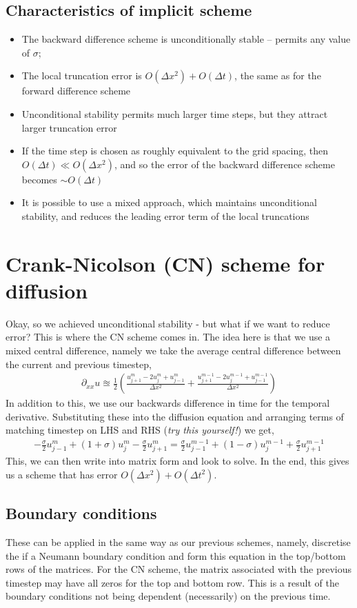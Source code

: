 \documentclass[11pt,a4paper]{report}
\theoremstyle{definition}
\begin{document}
\subsection{Characteristics of implicit scheme}
\begin{itemize}
	\item The backward difference scheme is unconditionally stable – permits any value of $\sigma$;
	\item The local truncation error is $O(\Delta x^2)+O(\Delta t)$, the same as for the forward difference scheme
	\item Unconditional stability permits much larger time steps, but they attract larger truncation error
	\item If the time step is chosen as roughly equivalent to the grid spacing, then $O(\Delta t) \ll O(\Delta x^2)$, and so the
	error of the backward difference scheme becomes $\sim O(\Delta t)$
	\item It is possible to use a mixed approach, which maintains unconditional stability, and reduces the leading error term of the local truncations
\end{itemize}


\section{Crank-Nicolson (CN) scheme for diffusion}
Okay, so we achieved unconditional stability - but what if we want to reduce error? This is where the CN scheme comes in. The idea here is that we use a mixed central difference, namely we take the average central difference between the current and previous timestep,
\begin{align*}
\partial_{xx} u \approxeq \frac{1}{2} \left(\frac{u_{j+1}^m - 2u_j^m + u_{j-1}^m}{\Delta x ^2} + \frac{u_{j+1}^{m-1} - 2u_j^{m-1} + u_{j-1}^{m-1}}{\Delta x ^2}\right) 
\end{align*}
In addition to this, we use our backwards difference in time for the temporal derivative. Substituting these into the diffusion equation and arranging terms of matching timestep on LHS and RHS (\textit{try this yourself!}) we get,
\begin{align*}
	-\frac{\sigma}{2} u_{j-1}^m + (1+\sigma) u_j^m - \frac{\sigma}{2}u_{j+1}^m = 
	 \frac{\sigma}{2} u_{j-1}^{m-1} + (1-\sigma) u_j^{m-1} + \frac{\sigma}{2}u_{j+1}^{m-1}
\end{align*}
This, we can then write into matrix form and look to solve. In the end, this gives us a scheme that has error $O(\Delta x^2) + O(\Delta t^2)$. \\

\subsection{Boundary conditions}
These can be applied in the same way as our previous schemes, namely, discretise the if a Neumann boundary condition and form this equation in the top/bottom rows of the matrices. For the CN scheme, the matrix associated with the previous timestep may have all zeros for the top and bottom row. This is a result of the boundary conditions not being dependent (necessarily) on the previous time. 
\end{document}
